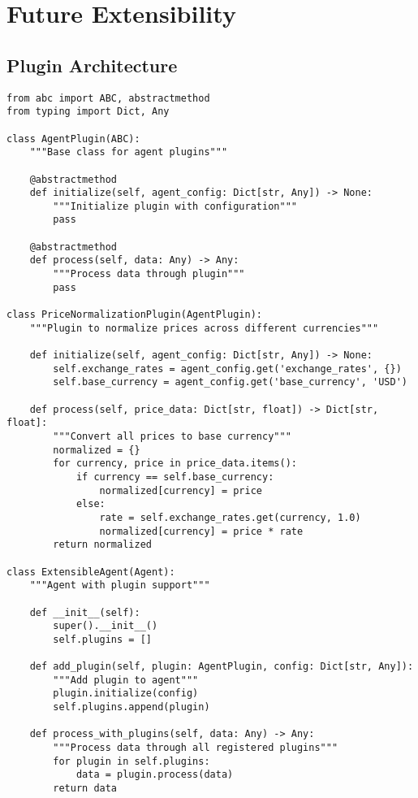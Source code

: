 \section{Future Extensibility}

\subsection{Plugin Architecture}

\begin{lstlisting}[caption=Plugin System for Agent Extensions]
from abc import ABC, abstractmethod
from typing import Dict, Any

class AgentPlugin(ABC):
    """Base class for agent plugins"""
    
    @abstractmethod
    def initialize(self, agent_config: Dict[str, Any]) -> None:
        """Initialize plugin with configuration"""
        pass
    
    @abstractmethod
    def process(self, data: Any) -> Any:
        """Process data through plugin"""
        pass

class PriceNormalizationPlugin(AgentPlugin):
    """Plugin to normalize prices across different currencies"""
    
    def initialize(self, agent_config: Dict[str, Any]) -> None:
        self.exchange_rates = agent_config.get('exchange_rates', {})
        self.base_currency = agent_config.get('base_currency', 'USD')
    
    def process(self, price_data: Dict[str, float]) -> Dict[str, float]:
        """Convert all prices to base currency"""
        normalized = {}
        for currency, price in price_data.items():
            if currency == self.base_currency:
                normalized[currency] = price
            else:
                rate = self.exchange_rates.get(currency, 1.0)
                normalized[currency] = price * rate
        return normalized

class ExtensibleAgent(Agent):
    """Agent with plugin support"""
    
    def __init__(self):
        super().__init__()
        self.plugins = []
    
    def add_plugin(self, plugin: AgentPlugin, config: Dict[str, Any]):
        """Add plugin to agent"""
        plugin.initialize(config)
        self.plugins.append(plugin)
    
    def process_with_plugins(self, data: Any) -> Any:
        """Process data through all registered plugins"""
        for plugin in self.plugins:
            data = plugin.process(data)
        return data
\end{lstlisting}

